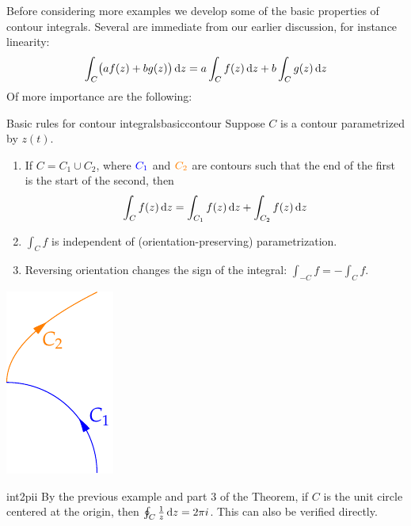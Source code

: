 Before considering more examples we develop some of the basic properties of contour integrals. Several are immediate from our earlier discussion, for instance linearity:
\[
	\int_C\bigl(af(z)+bg(z)\bigr)\,{\mathrm{d} z}=a\int_Cf(z)\,{\mathrm{d} z}+b\int_Cg(z)\,{\mathrm{d} z}
\]
Of more importance are the following:

\begin{thm}{Basic rules for contour integrals}{basiccontour}
	Suppose $C$ is a contour parametrized by $z(t)$.\par
	\begin{minipage}[t]{0.75\linewidth}\vspace{-5pt}
		\begin{enumerate}
		  \item If $C=C_1\cup C_2$, where $\textcolor{blue}{C_1}$ and $\textcolor{orange}{C_2}$ are contours such that the end of the first is the start of the second, then
		  \[
		  	\int_Cf(z)\,{\mathrm{d} z}=\int_{C_1}f(z)\,{\mathrm{d} z}+\int_{C_2}f(z)\,{\mathrm{d} z}
		  \]
		  \item $\int_Cf$ is independent of (orientation-preserving) parametrization.
		  \item Reversing orientation changes the sign of the integral: $\int_{-C}f=-\int_Cf$.
		\end{enumerate}
	\end{minipage}
	\hfill
	\begin{minipage}[t]{0.24\linewidth}\vspace{-5pt}
		\flushright\includegraphics{contours-ex5}
	\end{minipage}
\end{thm}


\begin{example}{}{int2pii}
	By the previous example and part 3 of the Theorem, if $C$ is the unit circle centered at the origin, then $\oint_C\frac 1z\,{\mathrm{d} z}=2\pi i$. This can also be verified  directly.
\end{example}
\goodbreak



